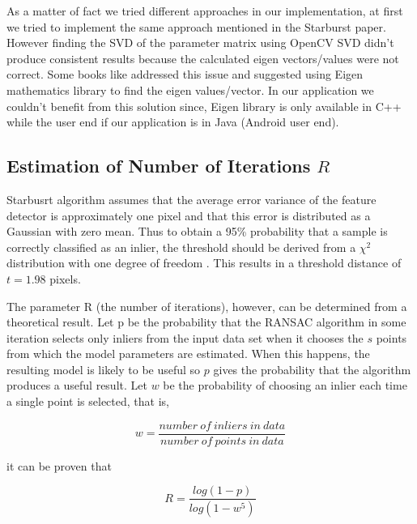 \documentclass[12pt,fleqn]{book} %
\begin{document}
As a matter of fact we tried different approaches in our implementation, at first we tried to implement the same approach mentioned in the Starburst paper. However finding the SVD of the parameter matrix using OpenCV SVD didn't produce consistent results because the calculated eigen vectors/values were not correct. Some books like \cite{practicalOpenCV} addressed this issue and suggested using Eigen mathematics library \cite{eigenweb} to find the eigen values/vector. In our application we couldn't benefit from this solution since, Eigen library is only available in C++ while the user end if our application is in Java (Android user end).


\subsection{Estimation of Number of Iterations $R$}
Starbusrt algorithm assumes that the average error variance of the feature detector is approximately one pixel and that this error is distributed as a Gaussian with zero mean. Thus to obtain a 95\% probability that a sample is correctly classified as an inlier, the threshold should be derived from a $\chi^{2}$ distribution with one degree of freedom \cite{multipleViewGeom}. This results in a threshold distance of $t = 1.98$ pixels. \bigskip

The parameter R (the number of iterations), however, can be determined from a theoretical result. Let p be the probability that the RANSAC algorithm in some iteration selects only inliers from the input data set when it chooses the $s$ points from which the model parameters are estimated. When this happens, the resulting model is likely to be useful so $p$ gives the probability that the algorithm produces a useful result. Let $w$ be the probability of choosing an inlier each time a single point is selected, that is, 
\begin{dBox}
	$$ w = \frac{number \: of \: inliers \: in \: data}{number \: of \: points \: in \: data} $$
\end{dBox}
it can be proven that 
\begin{dBox}
\begin{equation}
		R = \frac{log(1-p)}{log(1-w^{5})}
\end{equation}
\end{dBox}
\end{document}
